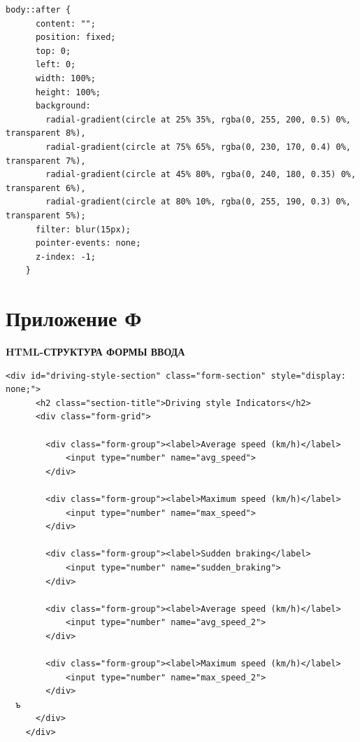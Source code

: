 \begin{lstlisting}[caption={Основные стили оформления}, label={lst:css}    
    breakatwhitespace=true,
    breakindent=10pt,
    columns=fullflexible
]
    body::after {
      content: "";
      position: fixed;  
      top: 0;
      left: 0;
      width: 100%;
      height: 100%;
      background: 
        radial-gradient(circle at 25% 35%, rgba(0, 255, 200, 0.5) 0%, transparent 8%),
        radial-gradient(circle at 75% 65%, rgba(0, 230, 170, 0.4) 0%, transparent 7%),
        radial-gradient(circle at 45% 80%, rgba(0, 240, 180, 0.35) 0%, transparent 6%),
        radial-gradient(circle at 80% 10%, rgba(0, 255, 190, 0.3) 0%, transparent 5%);
      filter: blur(15px);  
      pointer-events: none;
      z-index: -1;
    }

\end{lstlisting}

\newpage
\section*{Приложение Ф}
\label{app:html_form}
\begin{center}
\textbf{HTML-СТРУКТУРА ФОРМЫ ВВОДА}
\end{center}

\vspace{1cm}

\begin{lstlisting}[caption={Разметка формы калькулятора}, label={lst:html}    
    breakatwhitespace=true,
    breakindent=10pt,
    columns=fullflexible
]
<div id="driving-style-section" class="form-section" style="display: none;">
      <h2 class="section-title">Driving style Indicators</h2>
      <div class="form-grid">

        <div class="form-group"><label>Average speed (km/h)</label>
            <input type="number" name="avg_speed">
        </div>

        <div class="form-group"><label>Maximum speed (km/h)</label>
            <input type="number" name="max_speed">
        </div>
   
        <div class="form-group"><label>Sudden braking</label>
            <input type="number" name="sudden_braking">
        </div>
        
        <div class="form-group"><label>Average speed (km/h)</label>
            <input type="number" name="avg_speed_2">
        </div>

        <div class="form-group"><label>Maximum speed (km/h)</label>
            <input type="number" name="max_speed_2">
        </div>
  ъ
      </div>
    </div>
\end{lstlisting}

